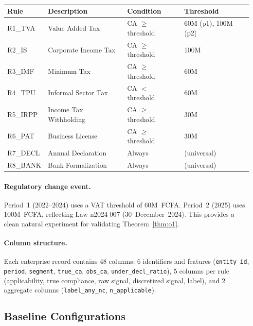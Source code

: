 \begin{center}
\renewcommand{\arraystretch}{1.15}
\begin{tabular}{llll}
\toprule
\textbf{Rule} & \textbf{Description} & \textbf{Condition} & \textbf{Threshold} \\
\midrule
R1\_TVA  & Value Added Tax       & CA $\geq$ threshold & 60M (p1), 100M (p2) \\
R2\_IS   & Corporate Income Tax  & CA $\geq$ threshold & 100M \\
R3\_IMF  & Minimum Tax           & CA $\geq$ threshold & 60M \\
R4\_TPU  & Informal Sector Tax   & CA $<$ threshold    & 60M \\
R5\_IRPP & Income Tax Withholding & CA $\geq$ threshold & 30M \\
R6\_PAT  & Business License      & CA $\geq$ threshold & 30M \\
R7\_DECL & Annual Declaration    & Always              & (universal) \\
R8\_BANK & Bank Formalization    & Always              & (universal) \\
\bottomrule
\end{tabular}
\end{center}

\paragraph{Regulatory change event.}
Period~1 (2022--2024) uses a VAT threshold of 60M~FCFA. Period~2
(2025) uses 100M~FCFA, reflecting Law n\textdegree{}2024-007
(30~December~2024). This provides a clean natural experiment for
validating Theorem~\ref{thm:o1}.

\paragraph{Column structure.}
Each enterprise record contains 48 columns: 6 identifiers and
features (\texttt{entity\_id}, \texttt{period}, \texttt{segment},
\texttt{true\_ca}, \texttt{obs\_ca}, \texttt{under\_decl\_ratio}),
5 columns per rule (applicability, true compliance, raw signal,
discretized signal, label), and 2 aggregate columns
(\texttt{label\_any\_nc}, \texttt{n\_applicable}).


\subsection{Baseline Configurations}

